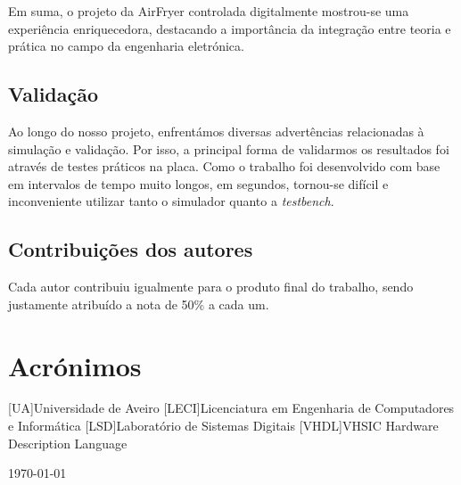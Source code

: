 \documentclass[a4paper, 11pt, onecolumn, oneside]{report}
\begin{document}
Em suma, o projeto da AirFryer controlada digitalmente mostrou-se uma experiência enriquecedora, destacando a importância da integração entre teoria e prática no campo da engenharia eletrónica. 

\section{Validação}
Ao longo do nosso projeto, enfrentámos diversas advertências relacionadas à simulação e validação. Por isso, a principal forma de validarmos os resultados foi através de testes práticos na placa. Como o trabalho foi desenvolvido com base em intervalos de tempo muito longos, em segundos, tornou-se difícil e inconveniente utilizar tanto o simulador quanto a \textit{testbench}.

\section{Contribuições dos autores}
Cada autor contribuiu igualmente para o produto final do trabalho, sendo justamente atribuído a nota de 50\% a cada um.

\chapter*{Acrónimos}
\begin{acronym}
[UA]{Universidade de Aveiro}
[LECI]{Licenciatura em Engenharia de Computadores e Informática}
[LSD]{Laboratório de Sistemas Digitais}
[VHDL]{VHSIC Hardware Description Language}
\end{acronym}

\begin{flushright}
    \today
\end{flushright}
\end{document}
